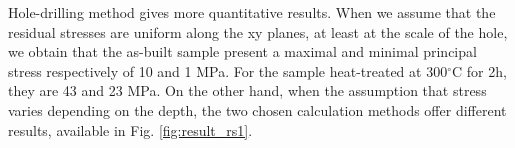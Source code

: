 \begin{center}
	\begin{table}[ht]
		\noindent{}
	
	\caption[Full width at half-maximum for the cut as-built sample and the 4 cubix heat-treated samples]{Average tensile mechanical properties of the as-built specimens from batch X200-180417}
	\label{tab:fwhm}
\end{table}
\end{center}

Hole-drilling method gives more quantitative results. When we assume that the residual stresses are uniform along the xy planes, at least at the scale of the hole, we obtain that the as-built sample present a maximal and minimal principal stress respectively of 10 and 1 MPa. For the sample heat-treated at 300$^\circ$C for 2h, they are 43 and 23 MPa. On the other hand, when the assumption that stress varies depending on the depth, the two chosen calculation methods offer different results, available in Fig. \ref{fig:result_rs1}.

